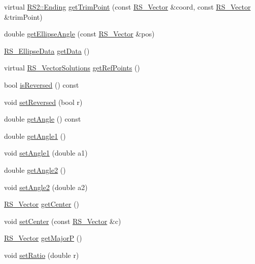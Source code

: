 \begin{DoxyCompactItemize}
virtual \hyperlink{class_r_s2_a30e80df2ef4bb36f4e89ea500eb212ab}{R\-S2\-::\-Ending} \hyperlink{class_r_s___ellipse_a5ee493b78f03642839dfd3c860304f55}{get\-Trim\-Point} (const \hyperlink{class_r_s___vector}{R\-S\-\_\-\-Vector} \&coord, const \hyperlink{class_r_s___vector}{R\-S\-\_\-\-Vector} \&trim\-Point)
\item 
double \hyperlink{class_r_s___ellipse_a52b594f69cd7705e143cdab5112ca344}{get\-Ellipse\-Angle} (const \hyperlink{class_r_s___vector}{R\-S\-\_\-\-Vector} \&pos)
\item 
\hyperlink{class_r_s___ellipse_data}{R\-S\-\_\-\-Ellipse\-Data} \hyperlink{class_r_s___ellipse_afa96db66498b21818c3d236d6c18c1f9}{get\-Data} ()
\item 
virtual \hyperlink{class_r_s___vector_solutions}{R\-S\-\_\-\-Vector\-Solutions} \hyperlink{class_r_s___ellipse_ab4ac56881606e43e806a79a5b0b69bbe}{get\-Ref\-Points} ()
\item 
bool \hyperlink{class_r_s___ellipse_a506f7e1f7d8a334743c088093c524850}{is\-Reversed} () const 
\item 
void \hyperlink{class_r_s___ellipse_ae7c0e3ce709d61e9ca79d731c6e21004}{set\-Reversed} (bool r)
\item 
double \hyperlink{class_r_s___ellipse_a6fe415728b0f748ad1d0c2f062d41c9d}{get\-Angle} () const 
\item 
double \hyperlink{class_r_s___ellipse_a327e3387adf67a7426df8b0cdd074828}{get\-Angle1} ()
\item 
void \hyperlink{class_r_s___ellipse_a987c7c5b621e17fb67db77ef2f9f52e6}{set\-Angle1} (double a1)
\item 
double \hyperlink{class_r_s___ellipse_a682f42e6cd6505ea5b3c02af164b8e70}{get\-Angle2} ()
\item 
void \hyperlink{class_r_s___ellipse_ababc7b1e1e5597673880b4aac5ebf097}{set\-Angle2} (double a2)
\item 
\hyperlink{class_r_s___vector}{R\-S\-\_\-\-Vector} \hyperlink{class_r_s___ellipse_a14c815c85924123321ab9bf3173735cc}{get\-Center} ()
\item 
void \hyperlink{class_r_s___ellipse_ae637e5155d6749747a6d9b2deb0a929d}{set\-Center} (const \hyperlink{class_r_s___vector}{R\-S\-\_\-\-Vector} \&c)
\item 
\hyperlink{class_r_s___vector}{R\-S\-\_\-\-Vector} \hyperlink{class_r_s___ellipse_ae7852f2d74669045ba1d50ff33567a71}{get\-Major\-P} ()
\item 
void \hyperlink{class_r_s___ellipse_a0cc133aa4a811a26b1aa1b12fb4a1fd0}{set\-Ratio} (double r)
\item 

\end{DoxyCompactItemize}
